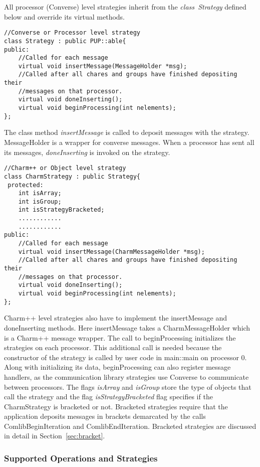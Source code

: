 All processor (Converse) level strategies inherit from the {\em
class~Strategy} defined below and override its virtual methods.

\begin{verbatim}
//Converse or Processor level strategy
class Strategy : public PUP::able{
public:
    //Called for each message
    virtual void insertMessage(MessageHolder *msg);
    //Called after all chares and groups have finished depositing their
    //messages on that processor.
    virtual void doneInserting();
    virtual void beginProcessing(int nelements);
};
\end{verbatim}

The class method {\em insertMessage} is called to deposit messages
with the strategy. MessageHolder is a wrapper for converse
messages. When a processor has sent all its messages, {\em
doneInserting} is invoked on the strategy.

\begin{verbatim}
//Charm++ or Object level strategy
class CharmStrategy : public Strategy{
 protected:
    int isArray;
    int isGroup;
    int isStrategyBracketed;
    ............   
    ............   
public:
    //Called for each message
    virtual void insertMessage(CharmMessageHolder *msg);
    //Called after all chares and groups have finished depositing their
    //messages on that processor.
    virtual void doneInserting();
    virtual void beginProcessing(int nelements);
};
\end{verbatim}

Charm++ level strategies also have to implement the insertMessage and
doneInserting methods. Here insertMessage takes a CharmMessageHolder
which is a Charm++ message wrapper. The call to beginProcessing
initializes the strategies on each processor. This additional call is
needed because the constructor of the strategy is called by user code
in main::main on processor 0. Along with initializing its data,
beginProcessing can also register message handlers, as the
communication library strategies use Converse to communicate between
processors. The flags {\em isArray} and {\em isGroup} store the type
of objects that call the strategy and the flag {\em
isStrategyBracketed} flag specifies if the CharmStrategy is bracketed
or not. Bracketed strategies require that the application deposits
messages in brackets demarcated by the calls ComlibBeginIteration and
ComlibEndIteration. Bracketed strategies are discussed in detail in
Section~\ref{sec:bracket}.

\subsubsection{Supported Operations and Strategies}

